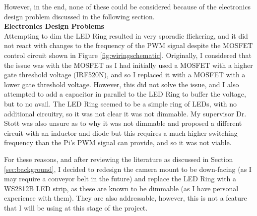 \vspace{-0.5em}
\noindent
However, in the end, none of these could be considered because of the electronics design problem discussed in the following section. \\
\noindent
\textbf{Electronics Design Problems} \\
Attempting to dim the LED Ring resulted in very sporadic flickering, and it did not react with changes to the frequency of the PWM signal despite the MOSFET control circuit shown in Figure \ref*{fig:wiringschematic}.
Originally, I considered that the issue was with the MOSFET as I had initially used a MOSFET with a higher gate threshold voltage (IRF520N), and so I replaced it with a MOSFET with a lower gate threshold voltage.
However, this did not solve the issue, and I also attempted to add a capacitor in parallel to the LED Ring to buffer the voltage, but to no avail.
The LED Ring seemed to be a simple ring of LEDs, with no additional circuitry, so it was not clear it was not dimmable.
My supervisor Dr. Stott was also unsure as to why it was not dimmable and proposed a different circuit with an inductor and diode but this requires
a much higher switching frequency than the Pi's PWM signal can provide, and so it was not viable. 

For these reasons, and after reviewing the literature as discussed in Section \ref*{sec:background}, I decided to redesign the camera mount to be down-facing (as I may require a conveyor belt in the future)
and replace the LED Ring with a WS2812B LED strip, as these are known to be dimmable (as I have personal experience with them). They are also addressable, however, this is not a feature that I will be using at this stage of the project.
